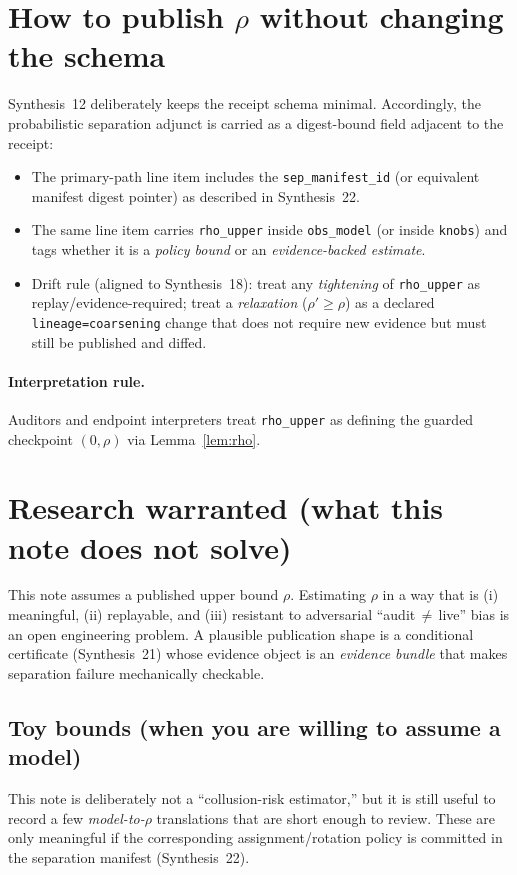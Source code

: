 \documentclass[11pt]{article}
\begin{document}
\section{How to publish $\rho$ without changing the schema}
Synthesis~12 deliberately keeps the receipt schema minimal.\cite{series:receiptitems}
Accordingly, the probabilistic separation adjunct is carried as a digest-bound field adjacent to the receipt:
\begin{itemize}[leftmargin=*]
\item The primary-path line item includes the \texttt{sep\_manifest\_id} (or equivalent manifest digest pointer) as described in Synthesis~22.\cite{series:primarysepmanifest}
\item The same line item carries \texttt{rho\_upper} inside \texttt{obs\_model} (or inside \texttt{knobs}) and tags whether it is a \emph{policy bound} or an \emph{evidence-backed estimate}.
\item Drift rule (aligned to Synthesis~18): treat any \emph{tightening} of \texttt{rho\_upper} as replay/evidence-required; treat a \emph{relaxation} ($\rho'\ge\rho$) as a declared \texttt{lineage=coarsening} change that does not require new evidence but must still be published and diffed.\cite{series:planstateequiv}
\end{itemize}

\paragraph{Interpretation rule.}
Auditors and endpoint interpreters treat \texttt{rho\_upper} as defining the guarded checkpoint $(0,\rho)$ via Lemma~\ref{lem:rho}.
\section{Research warranted (what this note does not solve)}
This note assumes a published upper bound $\rho$.
Estimating $\rho$ in a way that is (i) meaningful, (ii) replayable, and (iii) resistant to adversarial ``audit$\,\neq\,$live'' bias is an open engineering problem.
A plausible publication shape is a conditional certificate (Synthesis~21) whose evidence object is an \emph{evidence bundle} that makes separation failure mechanically checkable.\cite{series:condcert,series:auditorreplay}

\subsection{Toy bounds (when you are willing to assume a model)}
This note is deliberately not a ``collusion-risk estimator,'' but it is still useful to record a few \emph{model-to-$\rho$} translations that are short enough to review.
These are only meaningful if the corresponding assignment/rotation policy is committed in the separation manifest (Synthesis~22).\cite{series:primarysepmanifest}
\end{document}
